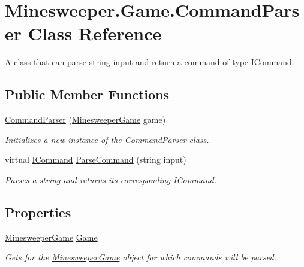 \hypertarget{class_minesweeper_1_1_game_1_1_command_parser}{\section{Minesweeper.\+Game.\+Command\+Parser Class Reference}
\label{class_minesweeper_1_1_game_1_1_command_parser}
}


A class that can parse string input and return a command of type \hyperlink{interface_minesweeper_1_1_game_1_1_i_command}{I\+Command}.  


\subsection*{Public Member Functions}
\begin{DoxyCompactItemize}
\item 
\hyperlink{class_minesweeper_1_1_game_1_1_command_parser_a2a6a51a7b7f582d80bc407f04867b9ea}{Command\+Parser} (\hyperlink{class_minesweeper_1_1_game_1_1_minesweeper_game}{Minesweeper\+Game} game)
\begin{DoxyCompactList}\small\item\em Initializes a new instance of the \hyperlink{class_minesweeper_1_1_game_1_1_command_parser}{Command\+Parser} class. \end{DoxyCompactList}\item 
virtual \hyperlink{interface_minesweeper_1_1_game_1_1_i_command}{I\+Command} \hyperlink{class_minesweeper_1_1_game_1_1_command_parser_ab31a5ac6a98e37117d0801cef6c9a188}{Parse\+Command} (string input)
\begin{DoxyCompactList}\small\item\em Parses a string and returns its corresponding \hyperlink{interface_minesweeper_1_1_game_1_1_i_command}{I\+Command}. \end{DoxyCompactList}\end{DoxyCompactItemize}
\subsection*{Properties}
\begin{DoxyCompactItemize}
\item 
\hyperlink{class_minesweeper_1_1_game_1_1_minesweeper_game}{Minesweeper\+Game} \hyperlink{class_minesweeper_1_1_game_1_1_command_parser_ad8ac44210715f94c2d35e94b7ca48a3a}{Game}
\begin{DoxyCompactList}\small\item\em Gets for the \hyperlink{class_minesweeper_1_1_game_1_1_minesweeper_game}{Minesweeper\+Game} object for which commands will be parsed. \end{DoxyCompactList}\end{DoxyCompactItemize}


